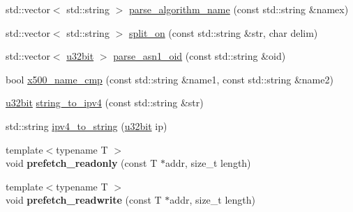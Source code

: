 \begin{DoxyCompactItemize}
std\-::vector$<$ std\-::string $>$ \hyperlink{namespaceBotan_a1b7d9d03612ef2670730d81e62deedb7}{parse\-\_\-algorithm\-\_\-name} (const std\-::string \&namex)
\item 
std\-::vector$<$ std\-::string $>$ \hyperlink{namespaceBotan_ab505759af82ff4c76aafe7711286b747}{split\-\_\-on} (const std\-::string \&str, char delim)
\item 
std\-::vector$<$ \hyperlink{namespaceBotan_aacc7d03c95e97e76168fc1c819031830}{u32bit} $>$ \hyperlink{namespaceBotan_a2136f44a7a30dc266057d6903ec04050}{parse\-\_\-asn1\-\_\-oid} (const std\-::string \&oid)
\item 
bool \hyperlink{namespaceBotan_a9680ae12c7a7c220fbf4edce4307c7d8}{x500\-\_\-name\-\_\-cmp} (const std\-::string \&name1, const std\-::string \&name2)
\item 
\hyperlink{namespaceBotan_aacc7d03c95e97e76168fc1c819031830}{u32bit} \hyperlink{namespaceBotan_a57e40c9f415da9579119100dff37e23c}{string\-\_\-to\-\_\-ipv4} (const std\-::string \&str)
\item 
std\-::string \hyperlink{namespaceBotan_a2441f79af134cbe0b542fddbe58b47b0}{ipv4\-\_\-to\-\_\-string} (\hyperlink{namespaceBotan_aacc7d03c95e97e76168fc1c819031830}{u32bit} ip)
\item 
\hypertarget{namespaceBotan_ac98d079fc4312757f211acddb232e331}{{\footnotesize template$<$typename T $>$ }\\void {\bfseries prefetch\-\_\-readonly} (const T $\ast$addr, size\-\_\-t length)}\label{namespaceBotan_ac98d079fc4312757f211acddb232e331}

\item 
\hypertarget{namespaceBotan_a9230581f5ab62707c5de29728b2812ad}{{\footnotesize template$<$typename T $>$ }\\void {\bfseries prefetch\-\_\-readwrite} (const T $\ast$addr, size\-\_\-t length)}\label{namespaceBotan_a9230581f5ab62707c5de29728b2812ad}


\end{DoxyCompactItemize}
